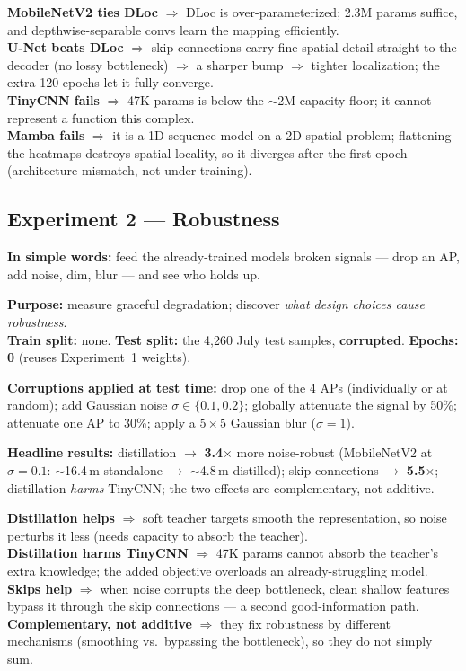 \documentclass[11pt]{article}
\begin{document}
\begin{whybox}
\textbf{MobileNetV2 ties DLoc} $\Rightarrow$ DLoc is over-parameterized; 2.3M params suffice, and
depthwise-separable convs learn the mapping efficiently.\\
\textbf{U-Net beats DLoc} $\Rightarrow$ skip connections carry fine spatial detail straight to the
decoder (no lossy bottleneck) $\Rightarrow$ a sharper bump $\Rightarrow$ tighter localization; the
extra 120 epochs let it fully converge.\\
\textbf{TinyCNN fails} $\Rightarrow$ 47K params is below the $\sim$2M capacity floor; it cannot
represent a function this complex.\\
\textbf{Mamba fails} $\Rightarrow$ it is a 1D-sequence model on a 2D-spatial problem; flattening the
heatmaps destroys spatial locality, so it diverges after the first epoch (architecture mismatch, not
under-training).
\end{whybox}

\subsection{Experiment 2 --- Robustness}
\textbf{In simple words:} feed the already-trained models broken signals --- drop an AP, add noise,
dim, blur --- and see who holds up.

\textbf{Purpose:} measure graceful degradation; discover \emph{what design choices cause robustness}.\\
\textbf{Train split:} none. \quad \textbf{Test split:} the 4{,}260 July test samples, \textbf{corrupted}.
\quad \textbf{Epochs: 0} (reuses Experiment~1 weights).

\textbf{Corruptions applied at test time:} drop one of the 4 APs (individually or at random); add
Gaussian noise $\sigma\in\{0.1,0.2\}$; globally attenuate the signal by 50\%; attenuate one AP to 30\%;
apply a $5\times5$ Gaussian blur ($\sigma=1$).

\textbf{Headline results:} distillation $\to$ \textbf{3.4$\times$} more noise-robust (MobileNetV2 at
$\sigma=0.1$: $\sim$16.4\,m standalone $\to$ $\sim$4.8\,m distilled); skip connections $\to$
\textbf{5.5$\times$}; distillation \emph{harms} TinyCNN; the two effects are complementary, not additive.

\begin{whybox}
\textbf{Distillation helps} $\Rightarrow$ soft teacher targets smooth the representation, so noise
perturbs it less (needs capacity to absorb the teacher).\\
\textbf{Distillation harms TinyCNN} $\Rightarrow$ 47K params cannot absorb the teacher's extra knowledge;
the added objective overloads an already-struggling model.\\
\textbf{Skips help} $\Rightarrow$ when noise corrupts the deep bottleneck, clean shallow features bypass
it through the skip connections --- a second good-information path.\\
\textbf{Complementary, not additive} $\Rightarrow$ they fix robustness by different mechanisms
(smoothing vs.\ bypassing the bottleneck), so they do not simply sum.
\end{whybox}
\end{document}
